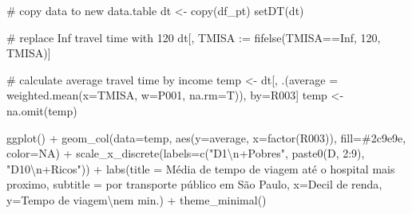 \documentclass[
  letterpaper,
  DIV=11,
  numbers=noendperiod]{scrreprt}
\newenvironment{Shaded}{\begin{snugshade}}{\end{snugshade}}
\newcommand{\AttributeTok}[1]{\textcolor[rgb]{0.40,0.45,0.13}{#1}}
\newcommand{\CommentTok}[1]{\textcolor[rgb]{0.37,0.37,0.37}{#1}}
\newcommand{\ConstantTok}[1]{\textcolor[rgb]{0.56,0.35,0.01}{#1}}
\newcommand{\DecValTok}[1]{\textcolor[rgb]{0.68,0.00,0.00}{#1}}
\newcommand{\ErrorTok}[1]{\textcolor[rgb]{0.68,0.00,0.00}{#1}}
\newcommand{\FunctionTok}[1]{\textcolor[rgb]{0.28,0.35,0.67}{#1}}
\newcommand{\NormalTok}[1]{\textcolor[rgb]{0.00,0.23,0.31}{#1}}
\newcommand{\OtherTok}[1]{\textcolor[rgb]{0.00,0.23,0.31}{#1}}
\newcommand{\SpecialCharTok}[1]{\textcolor[rgb]{0.37,0.37,0.37}{#1}}
\newcommand{\StringTok}[1]{\textcolor[rgb]{0.13,0.47,0.30}{#1}}
\begin{document}
\begin{Shaded}
\begin{Highlighting}[]
\CommentTok{\# copy data to new data.table}
\NormalTok{dt }\OtherTok{\textless{}{-}} \FunctionTok{copy}\NormalTok{(df\_pt)}
\FunctionTok{setDT}\NormalTok{(dt)}

\CommentTok{\# replace Inf travel time with 120}
\NormalTok{dt[, TMISA }\SpecialCharTok{:}\ErrorTok{=} \FunctionTok{fifelse}\NormalTok{(TMISA}\SpecialCharTok{==}\ConstantTok{Inf}\NormalTok{, }\DecValTok{120}\NormalTok{, TMISA)]}

\CommentTok{\# calculate average travel time by income}
\NormalTok{temp }\OtherTok{\textless{}{-}}\NormalTok{ dt[, .(}\AttributeTok{average =} \FunctionTok{weighted.mean}\NormalTok{(}\AttributeTok{x=}\NormalTok{TMISA, }\AttributeTok{w=}\NormalTok{P001, }\AttributeTok{na.rm=}\NormalTok{T)), by}\OtherTok{=}\NormalTok{R003]}
\NormalTok{temp }\OtherTok{\textless{}{-}} \FunctionTok{na.omit}\NormalTok{(temp)}

\FunctionTok{ggplot}\NormalTok{() }\SpecialCharTok{+} 
  \FunctionTok{geom\_col}\NormalTok{(}\AttributeTok{data=}\NormalTok{temp, }\FunctionTok{aes}\NormalTok{(}\AttributeTok{y=}\NormalTok{average, }\AttributeTok{x=}\FunctionTok{factor}\NormalTok{(R003)), }\AttributeTok{fill=}\StringTok{\textquotesingle{}\#2c9e9e\textquotesingle{}}\NormalTok{, }\AttributeTok{color=}\ConstantTok{NA}\NormalTok{) }\SpecialCharTok{+}
  \FunctionTok{scale\_x\_discrete}\NormalTok{(}\AttributeTok{labels=}\FunctionTok{c}\NormalTok{(}\StringTok{"D1}\SpecialCharTok{\textbackslash{}n}\StringTok{+Pobres"}\NormalTok{, }\FunctionTok{paste0}\NormalTok{(}\StringTok{\textquotesingle{}D\textquotesingle{}}\NormalTok{, }\DecValTok{2}\SpecialCharTok{:}\DecValTok{9}\NormalTok{), }\StringTok{"D10}\SpecialCharTok{\textbackslash{}n}\StringTok{+Ricos"}\NormalTok{)) }\SpecialCharTok{+}
  \FunctionTok{labs}\NormalTok{(}\AttributeTok{title =} \StringTok{\textquotesingle{}Média de tempo de viagem até o hospital mais proximo\textquotesingle{}}\NormalTok{,}
       \AttributeTok{subtitle =} \StringTok{\textquotesingle{}por transporte público em São Paulo\textquotesingle{}}\NormalTok{,}
       \AttributeTok{x=}\StringTok{\textquotesingle{}Decil de renda\textquotesingle{}}\NormalTok{, }\AttributeTok{y=}\StringTok{\textquotesingle{}Tempo de viagem}\SpecialCharTok{\textbackslash{}n}\StringTok{em min.\textquotesingle{}}\NormalTok{) }\SpecialCharTok{+}
  \FunctionTok{theme\_minimal}\NormalTok{()}
\end{Highlighting}
\end{Shaded}
\end{document}
